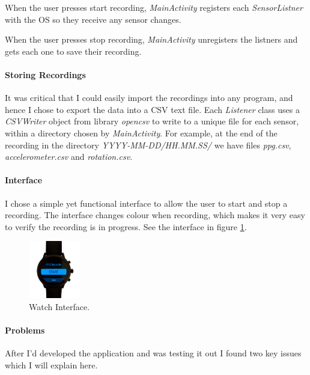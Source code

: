 \documentclass[12pt,a4paper,twoside,openright]{report}
\begin{document}
When the user presses start recording, \emph{MainActivity} registers each
\emph{SensorListner} with the OS so they receive any sensor changes.

When the user presses stop recording, \emph{MainActivity} unregisters the
listners and gets each one to save their recording.

\paragraph{Storing Recordings}

It was critical that I could easily import the recordings into any program, and
hence I chose to export the data into a CSV text file. Each \emph{Listener}
class uses a \emph{CSVWriter} object from library \emph{opencsv} to write to a
unique file for each sensor, within a directory chosen by \emph{MainActivity}.
For example, at the end of the recording in the directory
\emph{YYYY-MM-DD/HH.MM.SS/} we have files \emph{ppg.csv},
\emph{accelerometer.csv} and \emph{rotation.csv}.

\paragraph{Interface}

I chose a simple yet functional interface to allow the user to start and stop
a recording. The interface changes colour when recording, which makes it very
easy to verify the recording is in progress. See the interface in figure
\ref{fig:interface}.

\begin{figure}[tbh]
	\centerline{\includegraphics[width=0.2\textwidth]{figs/interface.png}}
	\caption{Watch Interface.}
	\label{fig:interface}
\end{figure}



\paragraph{Problems}

After I'd developed the application and was testing it out I found two key
issues which I will explain here.
\end{document}
